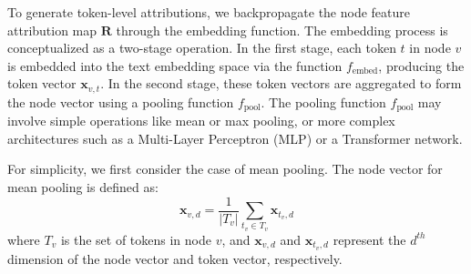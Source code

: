 
To generate token-level attributions, we backpropagate the node feature attribution map \( \mathbf{R} \) through the embedding function. The embedding process is conceptualized as a two-stage operation. In the first stage, each token \( t \) in node \( v \) is embedded into the text embedding space via the function \( f_{\text{embed}} \), producing the token vector \( \mathbf{x}_{v,t} \). In the second stage, these token vectors are aggregated to form the node vector using a pooling function \( f_{\text{pool}} \). The pooling function \( f_{\text{pool}} \) may involve simple operations like mean or max pooling, or more complex architectures such as a Multi-Layer Perceptron (MLP) or a Transformer network.




For simplicity, we first consider the case of mean pooling. The node vector for mean pooling is defined as:
\begin{equation}
    \mathbf{x}_{v,d} = \frac{1}{|T_v|} \sum_{t_v \in T_v} \mathbf{x}_{t_v,d}
    \label{eq:meanpool}
\end{equation}
where \( T_v \) is the set of tokens in node \( v \), and \( \mathbf{x}_{v,d} \) and \( \mathbf{x}_{t_v,d} \) represent the \( d^{th} \) dimension of the node vector and token vector, respectively.


